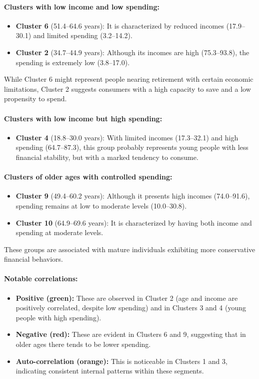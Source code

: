 \documentclass[10pt]{article}
\begin{document}
\paragraph{Clusters with low income and low spending:}
\begin{itemize}
    \item \textbf{Cluster 6} (51.4--64.6 years): It is characterized by reduced incomes (17.9--30.1) and limited spending (3.2--14.2).
    \item \textbf{Cluster 2} (34.7--44.9 years): Although its incomes are high (75.3--93.8), the spending is extremely low (3.8--17.0).
\end{itemize}
While Cluster 6 might represent people nearing retirement with certain economic limitations, Cluster 2 suggests consumers with a high capacity to save and a low propensity to spend.

\paragraph{Clusters with low income but high spending:}
\begin{itemize}
    \item \textbf{Cluster 4} (18.8--30.0 years): With limited incomes (17.3--32.1) and high spending (64.7--87.3), this group probably represents young people with less financial stability, but with a marked tendency to consume.
\end{itemize}

\paragraph{Clusters of older ages with controlled spending:}
\begin{itemize}
    \item \textbf{Cluster 9} (49.4--60.2 years): Although it presents high incomes (74.0--91.6), spending remains at low to moderate levels (10.0--30.8).
    \item \textbf{Cluster 10} (64.9--69.6 years): It is characterized by having both income and spending at moderate levels.
\end{itemize}
These groups are associated with mature individuals exhibiting more conservative financial behaviors.

\paragraph{Notable correlations:}
\begin{itemize}
    \item \textbf{Positive (green):} These are observed in Cluster 2 (age and income are positively correlated, despite low spending) and in Clusters 3 and 4 (young people with high spending).
    \item \textbf{Negative (red):} These are evident in Clusters 6 and 9, suggesting that in older ages there tends to be lower spending.
    \item \textbf{Auto-correlation (orange):} This is noticeable in Clusters 1 and 3, indicating consistent internal patterns within these segments.
\end{itemize}
\end{document}

